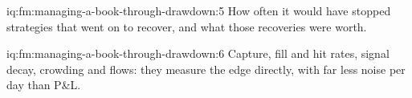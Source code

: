 \begin{solution}{iq:fm:managing-a-book-through-drawdown:5}
How often it would have stopped strategies that went on to recover, and what those recoveries were worth.
\end{solution}

\begin{solution}{iq:fm:managing-a-book-through-drawdown:6}
Capture, fill and hit rates, signal decay, crowding and flows: they measure the edge directly, with far less noise per day than P\&L.
\end{solution}
